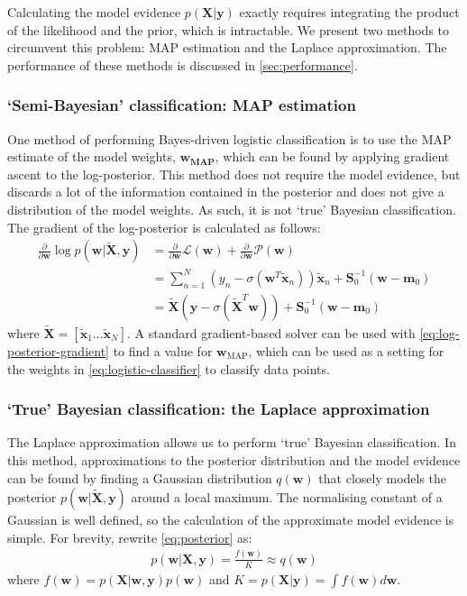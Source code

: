 \documentclass[a4paper]{article}
\begin{document}
    Calculating the model evidence $p(\bm{X} | \bm{y})$ exactly requires integrating the product of the likelihood and the prior, which is intractable.
    We present two methods to circumvent this problem: MAP estimation and the Laplace approximation. The performance of these methods is discussed in \autoref{sec:performance}.

    \subsubsection{`Semi-Bayesian' classification: MAP estimation}
    One method of performing Bayes-driven logistic classification is to use the MAP estimate of the model weights, $\bm{w_\text{MAP}}$, which can be found by applying gradient ascent to the log-posterior.
    This method does not require the model evidence, but discards a lot of the information contained in the posterior and does not give a distribution of the model weights.
    As such, it is not `true' Bayesian classification.
    The gradient of the log-posterior is calculated as follows:
    \begin{align}
        \frac{\partial}{\partial \bm{w}} \log p(\bm{w} | \tilde{\bm{X}}, \bm{y}) &= \frac{\partial}{\partial \bm{w}} \mathcal{L}(\bm{w}) + \frac{\partial}{\partial \bm{w}} \mathcal{P}(\bm{w}) \nonumber \\
        &= \sum_{n=1}^{N} \left(y_n - \sigma(\bm{w}^T \tilde{\bm{x}}_n) \right)  \tilde{\bm{x}}_n  + \bm{S}_0^{-1}(\bm{w} - \bm{m}_0) \nonumber \\
        &= \tilde{\bm{X}} (\textbf{y} - \sigma(\tilde{\bm{X}}^T \bm{w})) +  \bm{S}_0^{-1}(\bm{w} - \bm{m}_0)
        \label{eq:log-posterior-gradient}
    \end{align}
    where $\tilde{\bm{X}} = [\tilde{\bm{x}}_1 \dots \tilde{\bm{x}}_N]$.
    A standard gradient-based solver can be used with \autoref{eq:log-posterior-gradient} to find a value for $\bm{w}_\text{MAP}$, which can be used as a setting for the weights in \autoref{eq:logistic-classifier} to classify data points.

    \subsubsection{`True' Bayesian classification: the Laplace approximation}
    The Laplace approximation allows us to perform `true' Bayesian classification.
    In this method, approximations to the posterior distribution and the model evidence can be found by finding a Gaussian distribution $q(\bm{w})$ that closely models the posterior $p(\bm{w} | \tilde{\bm{X}}, \bm{y})$ around a local maximum.
    The normalising constant of a Gaussian is well defined, so the calculation of the approximate model evidence is simple.
    For brevity, rewrite \autoref{eq:posterior} as:
    \begin{align}
        p(\bm{w} | \bm{X}, \bm{y}) = \frac{f(\bm{w})}{K} \approx q(\bm{w}) \nonumber
    \end{align}
    where $f(\bm{w}) = p(\bm{X} | \bm{w}, \bm{y}) p(\bm{w})$ and $K = p(\bm{X} | \bm{y}) = \int f(\bm{w}) d\bm{w}$.
\end{document}
